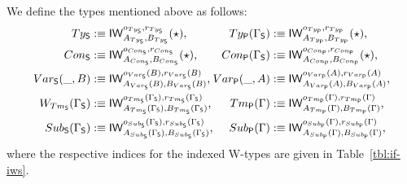 \begin{defn}
We define the types mentioned above as follows:
\begin{align*}
\begin{split}
{Ty_{\mathsf{S}}}
  &:\equiv \mathsf{IW}_{A_{Ty_{\mathsf{S}}}, B_{Ty_{\mathsf{S}}}}^{o_{Ty_{\mathsf{S}}},r_{Ty_{\mathsf{S}}}}(\star) \text{,} \\
{Con_{\mathsf{S}}}
  &:\equiv \mathsf{IW}_{A_{Con_{\mathsf{S}}}, B_{Con_{\mathsf{S}}}}^{o_{Con_{\mathsf{S}}},r_{Con_{\mathsf{S}}}}(\star) \text{,} \\
{Var_{\mathsf{S}}}(\_, B)
  &:\equiv \mathsf{IW}_{A_{Var_{\mathsf{S}}}(B), B_{Var_{\mathsf{S}}}(B)}^{o_{Var_{\mathsf{S}}}(B),r_{Var_{\mathsf{S}}}(B)} \text{,} \\
W_{Tm_{\mathsf{S}}}(\Gamma_{\mathsf{S}})
  &:\equiv \mathsf{IW}_{A_{Tm_{\mathsf{S}}}(\Gamma_{\mathsf{S}}), B_{Tm_{\mathsf{S}}}(\Gamma_{\mathsf{S}})}^{o_{Tm_{\mathsf{S}}}(\Gamma_{\mathsf{S}}),r_{Tm_{\mathsf{S}}}(\Gamma_{\mathsf{S}})} \text{,} \\
{Sub_{\mathsf{S}}}(\Gamma_{\mathsf{S}})
  &:\equiv \mathsf{IW}_{A_{Sub_{\mathsf{S}}}(\Gamma_{\mathsf{S}}), B_{Sub_{\mathsf{S}}}(\Gamma_{\mathsf{S}})}^{o_{Sub_{\mathsf{S}}}(\Gamma_{\mathsf{S}}),r_{Sub_{\mathsf{S}}}(\Gamma_{\mathsf{S}})} \text{,}
\end{split}
\begin{split}
{Ty_{\mathsf{P}}}(\Gamma_{\mathsf{S}})
  &:\equiv \mathsf{IW}_{A_{Ty_{\mathsf{P}}}, B_{Ty_{\mathsf{P}}}}^{o_{Ty_{\mathsf{P}}},r_{Ty_{\mathsf{P}}}}(\star) \text{,} \\
{Con_{\mathsf{P}}}(\Gamma_{\mathsf{S}})
  &:\equiv \mathsf{IW}_{A_{Con_{\mathsf{P}}}, B_{Con_{\mathsf{P}}}}^{o_{Con_{\mathsf{P}}},r_{Con_{\mathsf{P}}}}(\star) \text{,} \\
{Var_{\mathsf{P}}}(\_, A)
  &:\equiv \mathsf{IW}_{A_{Var_{\mathsf{P}}}(A), B_{Var_{\mathsf{P}}}(A)}^{o_{Var_{\mathsf{P}}}(A),r_{Var_{\mathsf{P}}}(A)} \text{,} \\
{Tm_{\mathsf{P}}}(\Gamma)
  &:\equiv \mathsf{IW}_{A_{Tm_{\mathsf{P}}}(\Gamma), B_{Tm_{\mathsf{P}}}(\Gamma)}^{o_{Tm_{\mathsf{P}}}(\Gamma),r_{Tm_{\mathsf{P}}}(\Gamma)} \text{,} \\
{Sub_{\mathsf{P}}}(\Gamma)
  &:\equiv \mathsf{IW}_{A_{Sub_{\mathsf{P}}}(\Gamma), B_{Sub_{\mathsf{P}}}(\Gamma)}^{o_{Sub_{\mathsf{P}}}(\Gamma),r_{Sub_{\mathsf{P}}}(\Gamma)} \text{,}
\end{split}
\end{align*}
where the respective indices for the indexed W-types are given in Table~\ref{tbl:if-iws}.
\end{defn}

